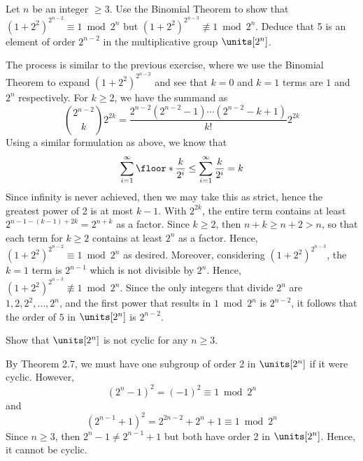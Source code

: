 \begin{specialexercise}\label{ex2.3.22}
    Let $n$ be an integer $\geq 3$. Use the Binomial Theorem to show that $(1 + 2^2)^{2^{n - 2}} \equiv 1 \bmod 2^n$ but $(1 + 2^2)^{2^{n - 3}} \not\equiv 1 \bmod 2^n$. Deduce that 5 is an element of order $2^{n - 2}$ in the multiplicative group $\units[2^n]$.
\end{specialexercise}

\begin{sol}
    The process is similar to the previous exercise, where we use the Binomial Theorem to expand $(1 + 2^2)^{2^{n - 2}}$ and see that $k = 0$ and $k = 1$ terms are $1$ and $2^n$ respectively. For $k \geq 2$, we have the summand as
    \[\binom{2^{n - 2}}k 2^{2k} = \frac{2^{n - 2}(2^{n - 2} - 1) \cdots (2^{n - 2} - k + 1)}{k!} 2^{2k}\]
    Using a similar formulation as above, we know that
    \[\sum_{i = 1}^\infty \floor*{\frac{k}{2^i}} \leq \sum_{i = 1}^\infty \frac{k}{2^i} = k\]
    Since infinity is never achieved, then we may take this as strict, hence the greatest power of 2 is at most $k - 1$. With $2^{2k}$, the entire term contains at least $2^{n - 1 - (k - 1) + 2k} = 2^{n + k}$ as a factor. Since $k \geq 2$, then $n + k \geq n + 2 > n$, so that each term for $k \geq 2$ contains at least $2^n$ as a factor. Hence, $(1 + 2^2)^{2^{n - 2}} \equiv 1 \bmod 2^n$ as desired. Moreover, considering $(1 + 2^2)^{2^{n - 3}}$, the $k = 1$ term is $2^{n - 1}$ which is not divisible by $2^n$. Hence, $(1 + 2^2)^{2^{n - 3}} \not\equiv 1 \bmod 2^n$. Since the only integers that divide $2^n$ are $1, 2, 2^2, \ldots, 2^n$, and the first power that results in $1 \bmod 2^n$ is $2^{n - 2}$, it follows that the order of $5$ in $\units[2^n]$ is $2^{n - 2}$.
\end{sol}

\begin{exercise}\label{ex2.3.23}
    Show that $\units[2^n]$ is not cyclic for any $n \ge 3$.
    
\end{exercise}

\begin{sol}
    By Theorem 2.7, we must have one subgroup of order 2 in $\units[2^n]$ if it were cyclic. However,
    \[(2^n - 1)^2 = (-1)^2 \equiv 1 \bmod 2^{n}\]
    and
    \[(2^{n - 1} + 1)^2 = 2^{2n - 2} + 2^n + 1 \equiv 1 \bmod 2^n\]
    Since $n \geq 3$, then $2^n - 1 \neq 2^{n - 1} + 1$ but both have order 2 in $\units[2^n]$. Hence, it cannot be cyclic.
\end{sol}


